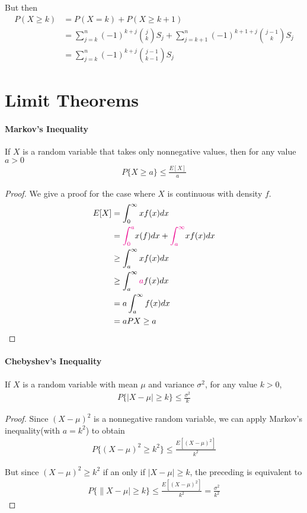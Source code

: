 \documentclass[10 pt,final]{article}
\newcommand{\impo}[1]{{\color{magenta} #1}}
\begin{document}
But then 
\begin{align*}
P(X \geq k) & = P(X=k) + P(X \geq k+1) \\
& = \sum^n_{j=k} (-1)^{k+j} \binom{j}{k} S_j + \sum^n_{j=k+1} (-1)^{k+1+j} \binom{j-1}{k} S_j \\
& = \sum^n_{j=k} (-1)^{k+j} \binom{j-1}{k-1} S_j
\end{align*}

\section{Limit Theorems}
\paragraph{Markov's Inequality} If $X$ is a random variable that takes only nonnegative values, then for any value $a > 0$
\begin{align*}
P\{X \geq a\} \leq \frac{E[X]}{a}
\end{align*}

\begin{proof}
We give a proof for the case where $X$ is continuous with density $f$.
\begin{align*}
E[X] & = \int_0^{\infty} xf(x)dx \\
& = \impo{\int_0^a} x(f)dx + \impo{\int_a^{\infty}} xf(x)dx \\
& \geq \int_a^{\infty} xf(x)dx \\
& \geq \int_a^{\infty} \impo{a}f(x)dx \\
& = a \int_a^{\infty} f(x) dx \\
& = a P{X \geq a}
\end{align*}
\end{proof}


\paragraph{Chebyshev's Inequality} If $X$ is a random variable with mean $\mu$ and variance $\sigma^2$, for any value $k >0$,
\begin{align*}
P\{|X-\mu| \geq k\} \leq \frac{\sigma^2}{k}
\end{align*}

\begin{proof}
Since $(X-\mu)^2$ is a nonnegative random variable, we can \impo{ apply Markov's inequality}(with $a = k^2$) to obtain
\begin{align*}
P\{ (X-\mu)^2 \geq k^2\} \leq \frac{E[(X-\mu)^2]}{k^2}
\end{align*}

But since $(X-\mu)^2 \geq k^2$ if an only if $|X-\mu| \geq k$, the preceding is equivalent to 
\begin{align*}
P\{\|X-\mu| \geq k\} \leq \frac{E[(X-\mu)^2]}{k^2} = \frac{\sigma^2}{k^2}
\end{align*}
\end{proof}
\end{document}
